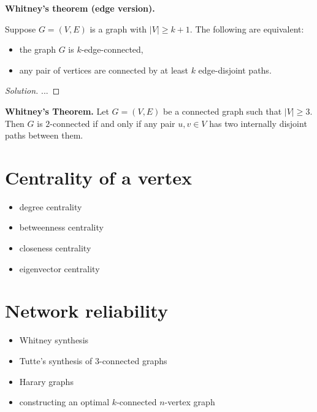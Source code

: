 \begin{theorem}
\textbf{Whitney's theorem (edge version).}
{\rm
Suppose $G=(V,E)$ is a graph with $|V|\geq k+1$. The following are
equivalent:
\begin{itemize}
\item
the graph $G$ is $k$-edge-connected,

\item
any pair of
vertices are connected by at least $k$ edge-disjoint paths.
\end{itemize}
}
\end{theorem}

\begin{proof}[Solution]

...

\end{proof}


\begin{theorem}
\textbf{Whitney's Theorem.}
Let $G = (V, E)$ be a connected graph such that $|V| \geq 3$. Then $G$
is $2$-connected if and only if any pair $u,v \in V$ has two
internally disjoint paths between them.
\end{theorem}



\section{Centrality of a vertex}

\begin{itemize}
\item degree centrality

\item betweenness centrality

\item closeness centrality

\item eigenvector centrality
\end{itemize}



\section{Network reliability}

\begin{itemize}
\item Whitney synthesis

\item Tutte's synthesis of $3$-connected graphs

\item Harary graphs

\item constructing an optimal $k$-connected $n$-vertex graph
\end{itemize}
